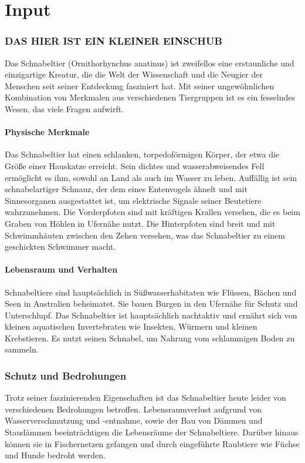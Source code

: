 \part{Input}

\section{DAS HIER IST EIN KLEINER EINSCHUB}
    Das Schnabeltier (Ornithorhynchus anatinus) ist zweifellos eine erstaunliche und einzigartige Kreatur, die die Welt der Wissenschaft und die Neugier der Menschen seit seiner Entdeckung fasziniert hat. Mit seiner ungewöhnlichen Kombination von Merkmalen aus verschiedenen Tiergruppen ist es ein fesselndes Wesen, das viele Fragen aufwirft.

    \subsection{Physische Merkmale}
        Das Schnabeltier hat einen schlanken, torpedoförmigen Körper, der etwa die Größe einer Hauskatze erreicht. Sein dichtes und wasserabweisendes Fell ermöglicht es ihm, sowohl an Land als auch im Wasser zu leben. Auffällig ist sein schnabelartiger Schnauz, der dem eines Entenvogels ähnelt und mit Sinnesorganen ausgestattet ist, um elektrische Signale seiner Beutetiere wahrzunehmen. Die Vorderpfoten sind mit kräftigen Krallen versehen, die es beim Graben von Höhlen in Ufernähe nutzt. Die Hinterpfoten sind breit und mit Schwimmhäuten zwischen den Zehen versehen, was das Schnabeltier zu einem geschickten Schwimmer macht.

    \subsection{Lebensraum und Verhalten}
       Schnabeltiere sind hauptsächlich in Süßwasserhabitaten wie Flüssen, Bächen und Seen in Australien beheimatet. Sie bauen Burgen in den Ufernähe für Schutz und Unterschlupf. Das Schnabeltier ist hauptsächlich nachtaktiv und ernährt sich von kleinen aquatischen Invertebraten wie Insekten, Würmern und kleinen Krebstieren. Es nutzt seinen Schnabel, um Nahrung vom schlammigen Boden zu sammeln.

\section{Schutz und Bedrohungen}
    Trotz seiner faszinierenden Eigenschaften ist das Schnabeltier heute leider von verschiedenen Bedrohungen betroffen. Lebensraumverlust aufgrund von Wasserverschmutzung und -entnahme, sowie der Bau von Dämmen und Staudämmen beeinträchtigen die Lebensräume der Schnabeltiere. Darüber hinaus können sie in Fischernetzen gefangen und durch eingeführte Raubtiere wie Füchse und Hunde bedroht werden.

